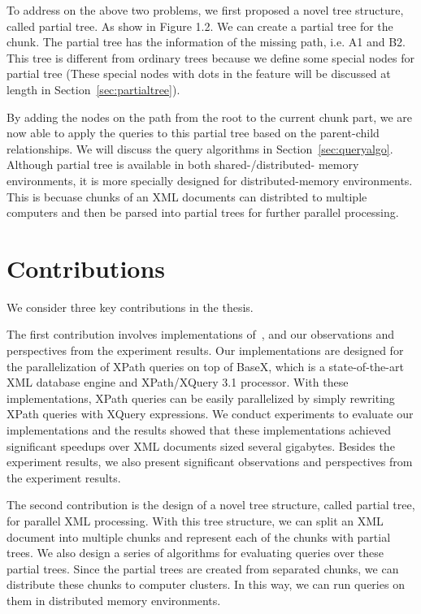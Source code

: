 To address on the above two problems, we first proposed a novel tree structure,
called partial tree. As show in Figure 1.2.  We can create a partial tree for
the chunk. The partial tree has the information  of the missing path, i.e. A1
and B2. This tree is different from ordinary trees  because we define some
special nodes for partial tree (These special nodes with  dots in the feature
will be discussed at length in Section~\ref{sec:partialtree}).



By adding the nodes on the path from the root to the current chunk part, we are
now able to apply the queries to this partial tree based on the parent-child
relationships. We will discuss the query algorithms in
Section~\ref{sec:queryalgo}. Although partial tree is available in both
shared-/distributed- memory environments, it is more specially designed for
distributed-memory environments. This is becuase chunks of an XML documents can
distribted to multiple computers and then be parsed into partial trees for
further parallel processing.


\section{Contributions}

We consider three key contributions in the thesis.


The first contribution involves implementations of~\cite{BoLS09}, and our
observations and perspectives from the experiment results. Our implementations
are designed for the parallelization of XPath queries on top of BaseX, which is
a state-of-the-art XML database engine and XPath/XQuery 3.1 processor. With
these implementations, XPath queries can be easily parallelized by simply
rewriting XPath queries with XQuery expressions. We conduct experiments to
evaluate our implementations and the results showed that these implementations
achieved significant speedups over XML documents sized several gigabytes.
Besides the experiment results, we also present
significant observations and perspectives from the experiment results.

The second contribution is the design of a novel tree structure, called partial
tree, for parallel XML processing. With this tree structure, we can split an XML
document into multiple chunks and represent each of the chunks with partial
trees. We also design a series of algorithms for evaluating queries over these
partial trees. Since the partial trees are created from separated chunks, we can
distribute these chunks to computer clusters. In this way, we can run queries on them
in distributed memory environments.

